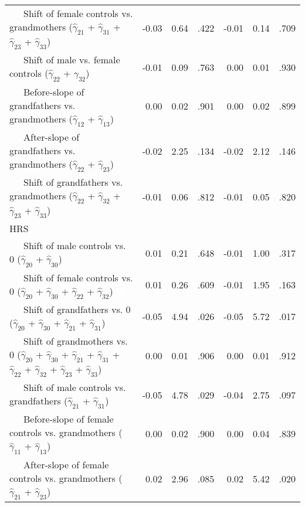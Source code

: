 \documentclass[
  english,
  man, noextraspace]{apa7}
\newenvironment{lltable}{\begin{landscape}\begin{center}\begin{ThreePartTable}}{\end{ThreePartTable}\end{center}\end{landscape}}
\begin{document}
\begin{appendix}
\begin{lltable}
{\begin{longtable}{lrrrrrr}
\ \ \ Shift of female controls vs. grandmothers 
($\hat{\gamma}_{21}$ + $\hat{\gamma}_{31}$ + 
$\hat{\gamma}_{23}$ + $\hat{\gamma}_{33}$) \textcolor{white}{L} & -0.03 & 0.64 & .422 & -0.01 & 0.14 & .709\\
\ \ \ Shift of male vs. female controls 
($\hat{\gamma}_{22}$ + $\hat{\gamma}_{32}$) \textcolor{white}{L} & -0.01 & 0.09 & .763 & 0.00 & 0.01 & .930\\
\ \ \ Before-slope of grandfathers vs. grandmothers 
($\hat{\gamma}_{12}$ + $\hat{\gamma}_{13}$) \textcolor{white}{L} & 0.00 & 0.02 & .901 & 0.00 & 0.02 & .899\\
\ \ \ After-slope of grandfathers vs. grandmothers 
($\hat{\gamma}_{22}$ + $\hat{\gamma}_{23}$) \textcolor{white}{L} & -0.02 & 2.25 & .134 & -0.02 & 2.12 & .146\\
\ \ \ Shift of grandfathers vs. grandmothers 
($\hat{\gamma}_{22}$ + $\hat{\gamma}_{32}$ + 
$\hat{\gamma}_{23}$ + $\hat{\gamma}_{33}$) \textcolor{white}{L} & -0.01 & 0.06 & .812 & -0.01 & 0.05 & .820\\
HRS &  &  &  &  &  & \\
\ \ \ Shift of male controls vs. 0 ($\hat{\gamma}_{20}$ + 
$\hat{\gamma}_{30}$) \textcolor{white}{H} & 0.01 & 0.21 & .648 & -0.01 & 1.00 & .317\\
\ \ \ Shift of female controls vs. 0 ($\hat{\gamma}_{20}$ + 
$\hat{\gamma}_{30}$ + $\hat{\gamma}_{22}$ + 
$\hat{\gamma}_{32}$) \textcolor{white}{H} & 0.01 & 0.26 & .609 & -0.01 & 1.95 & .163\\
\ \ \ Shift of grandfathers vs. 0 ($\hat{\gamma}_{20}$ + 
$\hat{\gamma}_{30}$ + $\hat{\gamma}_{21}$ + 
$\hat{\gamma}_{31}$) \textcolor{white}{H} & -0.05 & 4.94 & .026 & -0.05 & 5.72 & .017\\
\ \ \ Shift of grandmothers vs. 0 ($\hat{\gamma}_{20}$ + 
$\hat{\gamma}_{30}$ + $\hat{\gamma}_{21}$ + 
$\hat{\gamma}_{31}$ + $\hat{\gamma}_{22}$ + 
$\hat{\gamma}_{32}$ + $\hat{\gamma}_{23}$ +
$\hat{\gamma}_{33}$) \textcolor{white}{H} & 0.00 & 0.01 & .906 & 0.00 & 0.01 & .912\\
\ \ \ Shift of male controls vs. grandfathers 
($\hat{\gamma}_{21}$ + $\hat{\gamma}_{31}$) \textcolor{white}{H} & -0.05 & 4.78 & .029 & -0.04 & 2.75 & .097\\
\ \ \ Before-slope of female controls vs. grandmothers 
($\hat{\gamma}_{11}$ + $\hat{\gamma}_{13}$) \textcolor{white}{H} & 0.00 & 0.02 & .900 & 0.00 & 0.04 & .839\\
\ \ \ After-slope of female controls vs. grandmothers 
($\hat{\gamma}_{21}$ + $\hat{\gamma}_{23}$) \textcolor{white}{H} & 0.02 & 2.96 & .085 & 0.02 & 5.42 & .020\\

\end{longtable}}
\end{lltable}
\end{appendix}
\end{document}
